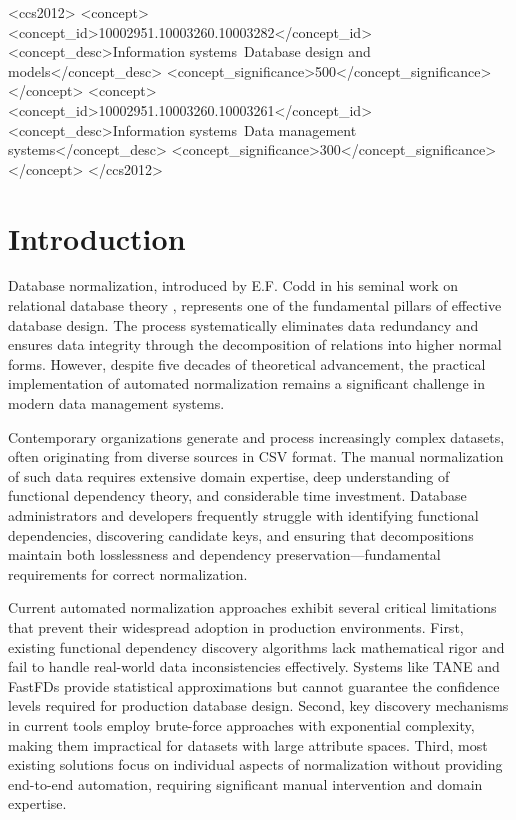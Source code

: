 \documentclass[acmsmall]{acmart}
\begin{document}
\begin{CCSXML}
<ccs2012>
<concept>
<concept_id>10002951.10003260.10003282</concept_id>
<concept_desc>Information systems~Database design and models</concept_desc>
<concept_significance>500</concept_significance>
</concept>
<concept>
<concept_id>10002951.10003260.10003261</concept_id>
<concept_desc>Information systems~Data management systems</concept_desc>
<concept_significance>300</concept_significance>
</concept>
</ccs2012>
\end{CCSXML}



\maketitle

\section{Introduction}

Database normalization, introduced by E.F. Codd in his seminal work on relational database theory \cite{codd1970}, represents one of the fundamental pillars of effective database design. The process systematically eliminates data redundancy and ensures data integrity through the decomposition of relations into higher normal forms. However, despite five decades of theoretical advancement, the practical implementation of automated normalization remains a significant challenge in modern data management systems.

Contemporary organizations generate and process increasingly complex datasets, often originating from diverse sources in CSV format. The manual normalization of such data requires extensive domain expertise, deep understanding of functional dependency theory, and considerable time investment. Database administrators and developers frequently struggle with identifying functional dependencies, discovering candidate keys, and ensuring that decompositions maintain both losslessness and dependency preservation—fundamental requirements for correct normalization.

Current automated normalization approaches exhibit several critical limitations that prevent their widespread adoption in production environments. First, existing functional dependency discovery algorithms lack mathematical rigor and fail to handle real-world data inconsistencies effectively. Systems like TANE \cite{tane2001} and FastFDs \cite{fastfds2008} provide statistical approximations but cannot guarantee the confidence levels required for production database design. Second, key discovery mechanisms in current tools employ brute-force approaches with exponential complexity, making them impractical for datasets with large attribute spaces. Third, most existing solutions focus on individual aspects of normalization without providing end-to-end automation, requiring significant manual intervention and domain expertise.
\end{document}
